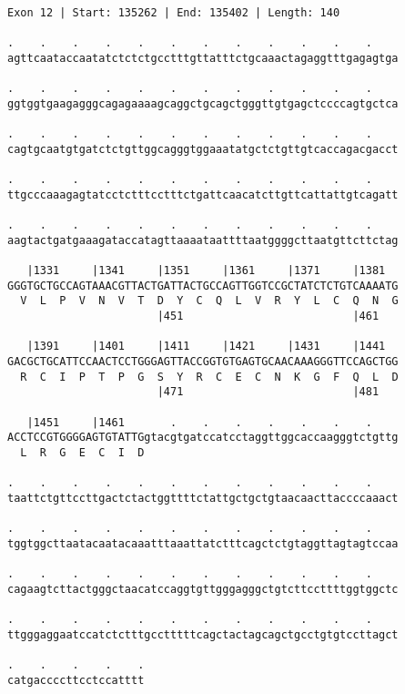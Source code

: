 \documentclass{article}
\begin{document}
\newpage
\begin{Verbatim}[fontfamily=courier]
Exon 12 | Start: 135262 | End: 135402 | Length: 140

.    .    .    .    .    .    .    .    .    .    .    .    
agttcaataccaatatctctctgcctttgttatttctgcaaactagaggtttgagagtga

.    .    .    .    .    .    .    .    .    .    .    .    
ggtggtgaagagggcagagaaaagcaggctgcagctgggttgtgagctccccagtgctca

.    .    .    .    .    .    .    .    .    .    .    .    
cagtgcaatgtgatctctgttggcagggtggaaatatgctctgttgtcaccagacgacct

.    .    .    .    .    .    .    .    .    .    .    .    
ttgcccaaagagtatcctctttcctttctgattcaacatcttgttcattattgtcagatt

.    .    .    .    .    .    .    .    .    .    .    .    
aagtactgatgaaagataccatagttaaaataattttaatggggcttaatgttcttctag

   |1331     |1341     |1351     |1361     |1371     |1381  
GGGTGCTGCCAGTAAACGTTACTGATTACTGCCAGTTGGTCCGCTATCTCTGTCAAAATG
  V  L  P  V  N  V  T  D  Y  C  Q  L  V  R  Y  L  C  Q  N  G
                       |451                          |461   

   |1391     |1401     |1411     |1421     |1431     |1441  
GACGCTGCATTCCAACTCCTGGGAGTTACCGGTGTGAGTGCAACAAAGGGTTCCAGCTGG
  R  C  I  P  T  P  G  S  Y  R  C  E  C  N  K  G  F  Q  L  D
                       |471                          |481   

   |1451     |1461       .    .    .    .    .    .    .    
ACCTCCGTGGGGAGTGTATTGgtacgtgatccatcctaggttggcaccaagggtctgttg
  L  R  G  E  C  I  D                                       

.    .    .    .    .    .    .    .    .    .    .    .    
taattctgttccttgactctactggttttctattgctgctgtaacaacttaccccaaact

.    .    .    .    .    .    .    .    .    .    .    .    
tggtggcttaatacaatacaaatttaaattatctttcagctctgtaggttagtagtccaa

.    .    .    .    .    .    .    .    .    .    .    .    
cagaagtcttactgggctaacatccaggtgttgggagggctgtcttccttttggtggctc

.    .    .    .    .    .    .    .    .    .    .    .    
ttgggaggaatccatctctttgcctttttcagctactagcagctgcctgtgtccttagct

.    .    .    .    .
catgaccccttcctccatttt
\end{Verbatim}
\newpage
\end{document}
